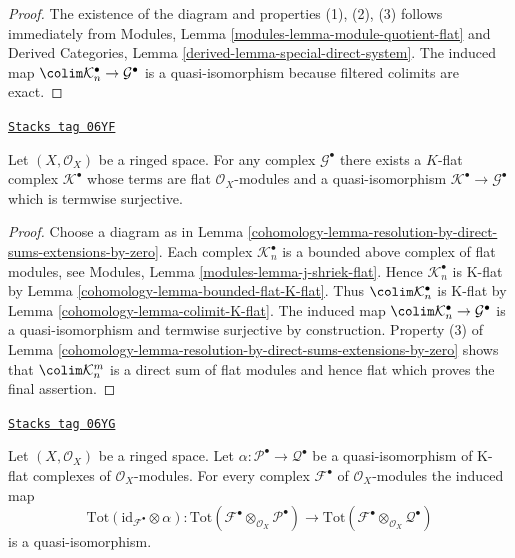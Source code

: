 \begin{proof}
The existence of the diagram and properties (1), (2), (3) follows immediately
from
Modules, Lemma \ref{modules-lemma-module-quotient-flat}
and
Derived Categories, Lemma \ref{derived-lemma-special-direct-system}.
The induced map
$\colim \mathcal{K}_n^\bullet \to \mathcal{G}^\bullet$
is a quasi-isomorphism because filtered colimits are exact.
\end{proof}

\begin{lemma}
\label{cohomology-lemma-K-flat-resolution}
\href{https://stacks.math.columbia.edu/tag/06YF}{\texttt{Stacks tag 06YF}}

Let $(X, \mathcal{O}_X)$ be a ringed space.
For any complex $\mathcal{G}^\bullet$ there exists a $K$-flat complex
$\mathcal{K}^\bullet$ whose terms are flat $\mathcal{O}_X$-modules
and a quasi-isomorphism $\mathcal{K}^\bullet \to \mathcal{G}^\bullet$
which is termwise surjective.
\end{lemma}

\begin{proof}

Choose a diagram as in
Lemma \ref{cohomology-lemma-resolution-by-direct-sums-extensions-by-zero}.
Each complex $\mathcal{K}_n^\bullet$ is a bounded
above complex of flat modules, see
Modules, Lemma \ref{modules-lemma-j-shriek-flat}.
Hence $\mathcal{K}_n^\bullet$ is K-flat by
Lemma \ref{cohomology-lemma-bounded-flat-K-flat}.
Thus $\colim \mathcal{K}_n^\bullet$ is K-flat by
Lemma \ref{cohomology-lemma-colimit-K-flat}.
The induced map
$\colim \mathcal{K}_n^\bullet \to \mathcal{G}^\bullet$
is a quasi-isomorphism and termwise surjective by construction.
Property (3) of Lemma \ref{cohomology-lemma-resolution-by-direct-sums-extensions-by-zero}
shows that $\colim \mathcal{K}_n^m$ is a direct sum of
flat modules and hence flat which proves the final assertion.
\end{proof}

\begin{lemma}
\label{cohomology-lemma-derived-tor-quasi-isomorphism-other-side}
\href{https://stacks.math.columbia.edu/tag/06YG}{\texttt{Stacks tag 06YG}}

Let $(X, \mathcal{O}_X)$ be a ringed space. Let
$\alpha : \mathcal{P}^\bullet \to \mathcal{Q}^\bullet$ be a
quasi-isomorphism of K-flat complexes of $\mathcal{O}_X$-modules.
For every complex $\mathcal{F}^\bullet$ of $\mathcal{O}_X$-modules
the induced map
$$
\text{Tot}(\text{id}_{\mathcal{F}^\bullet} \otimes \alpha) :
\text{Tot}(\mathcal{F}^\bullet \otimes_{\mathcal{O}_X} \mathcal{P}^\bullet)
\longrightarrow
\text{Tot}(\mathcal{F}^\bullet \otimes_{\mathcal{O}_X} \mathcal{Q}^\bullet)
$$
is a quasi-isomorphism.
\end{lemma}

